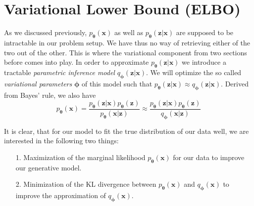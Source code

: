 \documentclass[12pt]{report}
\theoremstyle{definition}
\begin{document}

\section{Variational Lower Bound (ELBO)}
As we discussed previously, $p_{\mathbf{\theta}}(\mathbf{x})$ as well as $p_{\mathbf{\theta}}(\mathbf{z}|\mathbf{x})$ are supposed to be intractable in our problem setup. We have thus no way of retrieving either of the two out of the other. This is where the variational component from two sections before comes into play. In order to approximate $p_{\mathbf{\theta}}(\mathbf{z}|\mathbf{x})$ we introduce a tractable \emph{parametric inference model} $q_{\mathbf{\phi}}(\mathbf{z}|\mathbf{x})$. We will optimize the so called \emph{variational parameters} $\pmb{\phi}$ of this model such that $p_{\mathbf{\theta}}(\mathbf{z}|\mathbf{x}) \approx q_{\mathbf{\phi}}(\mathbf{z}|\mathbf{x})$.
Derived from Bayes' rule, we also have
\begin{equation}
	p_{\mathbf{\theta}}(\mathbf{x}) = \frac{p_{\mathbf{\theta}}(\mathbf{z}|\mathbf{x}) p_{\mathbf{\theta}}(\mathbf{z})}{p_{\mathbf{\theta}}(\mathbf{x}|\mathbf{z})} \approx  \frac{p_{\mathbf{\theta}}(\mathbf{z}|\mathbf{x}) p_{\mathbf{\theta}}(\mathbf{z})}{q_{\mathbf{\phi}}(\mathbf{x}|\mathbf{z})}
\end{equation}

It is clear, that for our model to fit the true distribution of our data well, we are interested in the following two things:
\begin{itemize}
	\item[1.] Maximization of the marginal likelihood $p_{\mathbf{\theta}}(\mathbf{x})$ for our data to improve our generative model.
	\item[2.] Minimization of the KL divergence between $p_{\mathbf{\theta}}(\mathbf{x})$ and $q_{\mathbf{\phi}}(\mathbf{x})$ to improve the approximation of $q_{\mathbf{\phi}}(\mathbf{x})$.
\end{itemize}
\end{document}
